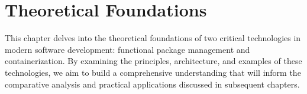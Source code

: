 \chapter{Theoretical Foundations}

This chapter delves into the theoretical foundations of two critical technologies in modern software development:
functional package management and containerization.
By examining the principles, architecture, and examples of these technologies,
we aim to build a comprehensive understanding that will inform the comparative analysis
and practical applications discussed in subsequent chapters.



